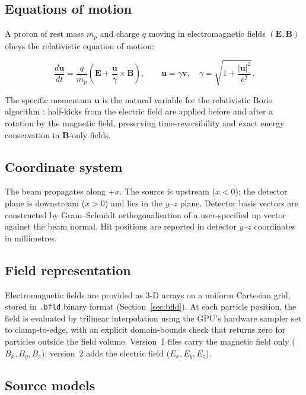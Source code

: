 \documentclass[review,12pt]{elsarticle}
\begin{document}
\subsection{Equations of motion}

A proton of rest mass $m_p$ and charge $q$ moving in electromagnetic fields
$(\mathbf{E}, \mathbf{B})$ obeys the relativistic equation of motion:

\begin{equation}
  \frac{d\mathbf{u}}{dt} = \frac{q}{m_p}\left(\mathbf{E} + \frac{\mathbf{u}}{\gamma} \times \mathbf{B}\right),
  \qquad \mathbf{u} = \gamma\mathbf{v}, \quad \gamma = \sqrt{1 + \frac{|\mathbf{u}|^2}{c^2}}.
  \label{eq:eom}
\end{equation}

The specific momentum $\mathbf{u}$ is the natural variable for the relativistic Boris
algorithm \cite{boris1970}: half-kicks from the electric field are applied before and
after a rotation by the magnetic field, preserving time-reversibility and exact
energy conservation in $\mathbf{B}$-only fields.

\subsection{Coordinate system}

The beam propagates along $+x$. The source is upstream ($x < 0$); the detector plane
is downstream ($x > 0$) and lies in the $y$--$z$ plane. Detector basis vectors are
constructed by Gram--Schmidt orthogonalisation of a user-specified up vector against the
beam normal. Hit positions are reported in detector $y$--$z$ coordinates in millimetres.

\subsection{Field representation}

Electromagnetic fields are provided as 3-D arrays on a uniform Cartesian grid,
stored in \texttt{.bfld} binary format (Section~\ref{sec:bfld}). At each particle
position, the field is evaluated by trilinear interpolation using the GPU's hardware
sampler set to clamp-to-edge, with an explicit domain-bounds check that returns zero
for particles outside the field volume. Version~1 files carry the magnetic field only
($B_x, B_y, B_z$); version~2 adds the electric field ($E_x, E_y, E_z$).

\subsection{Source models}
\end{document}
